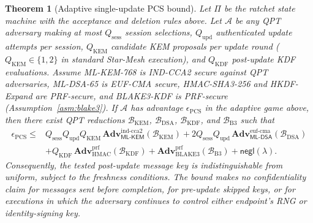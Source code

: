\documentclass[11pt,a4paper]{article}
\newtheorem{theorem}{Theorem}[section]
\theoremstyle{remark}
\theoremstyle{plain}
\newcommand{\negl}{\mathsf{negl}}
\newcommand{\Adv}{\mathbf{Adv}}
\newcommand{\MLKEM}{\mathsf{ML\text{-}KEM}}
\newcommand{\MLDSA}{\mathsf{ML\text{-}DSA}}
\begin{document}
\begin{theorem}[Adaptive single-update PCS bound]
\label{thm:single-update-pcs}
Let $\Pi$ be the ratchet state machine with the acceptance and deletion rules above.  Let
$\mathcal{A}$ be any QPT adversary making at most $Q_{\mathrm{sess}}$ session selections,
$Q_{\mathrm{upd}}$ authenticated update attempts per session, $Q_{\mathrm{KEM}}$ candidate KEM
proposals per update round ($Q_{\mathrm{KEM}} \in \{1, 2\}$ in standard Star-Mesh execution), and $Q_{\mathrm{KDF}}$ post-update KDF evaluations.
Assume ML-KEM-768 is IND-CCA2 secure against QPT adversaries, ML-DSA-65 is EUF-CMA secure,
HMAC-SHA3-256 and HKDF-Expand are PRF-secure, and BLAKE3-KDF is PRF-secure (Assumption~\ref{asm:blake3}).  If $\mathcal{A}$ has
advantage $\epsilon_{\mathrm{PCS}}$ in the adaptive game above, then there exist QPT
reductions $\mathcal{B}_{\mathrm{KEM}}$, $\mathcal{B}_{\mathrm{DSA}}$, $\mathcal{B}_{\mathrm{KDF}}$, and $\mathcal{B}_{\mathrm{B3}}$ such that
\[
\begin{aligned}
\epsilon_{\mathrm{PCS}}
 \leq{}&
 Q_{\mathrm{sess}}Q_{\mathrm{upd}}Q_{\mathrm{KEM}}\,
       \Adv^{\mathrm{ind\text{-}cca2}}_{\MLKEM}(\mathcal{B}_{\mathrm{KEM}})
 +2Q_{\mathrm{sess}}Q_{\mathrm{upd}}\,
       \Adv^{\mathrm{euf\text{-}cma}}_{\MLDSA}(\mathcal{B}_{\mathrm{DSA}})\\
&+Q_{\mathrm{KDF}}\,
       \Adv^{\mathrm{prf}}_{\mathrm{HMAC}}(\mathcal{B}_{\mathrm{KDF}})
 +\Adv^{\mathrm{prf}}_{\mathrm{BLAKE3}}(\mathcal{B}_{\mathrm{B3}})
 + \negl(\lambda).
\end{aligned}
\]
Consequently, the tested post-update message key is indistinguishable from uniform, subject
to the freshness conditions.  The bound makes no confidentiality claim for messages sent
before completion, for pre-update skipped keys, or for executions in which the adversary
continues to control either endpoint's RNG or identity-signing key.
\end{theorem}
\end{document}
